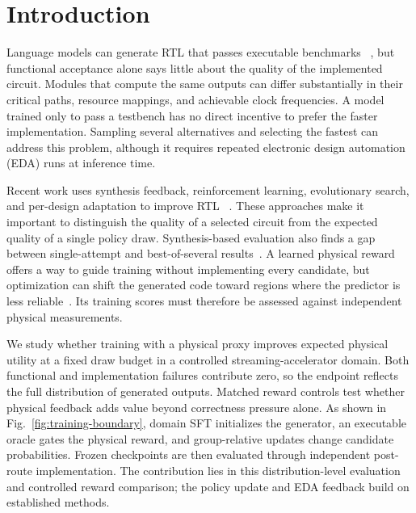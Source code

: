 \section{Introduction}
\label{sec:introduction}

Language models can generate RTL that passes executable benchmarks
~\cite{liu2023verilogeval,lu2024rtllm,pinckney2025revisiting}, but functional
acceptance alone says little about the quality of the implemented circuit.
Modules that compute the same outputs can differ substantially in their critical
paths, resource mappings, and achievable clock frequencies. A model trained
only to pass a testbench has no direct incentive to prefer the faster
implementation. Sampling several alternatives and selecting the fastest can
address this problem, although it requires repeated electronic design automation
(EDA) runs at inference time.

Recent work uses synthesis feedback, reinforcement learning, evolutionary
search, and per-design adaptation to improve RTL
~\cite{ppartl2025,chipseek2025,yao2024rtlrewriter,poet2026,
evolve2026,zhou2026alphartl,drrtl2026}. These approaches make it important to
distinguish the quality of a selected circuit from the expected quality of a
single policy draw. Synthesis-based evaluation also finds a gap between
single-attempt and best-of-several results~\cite{fu2026synthesis}. A learned
physical reward offers a way to guide training without implementing every
candidate, but optimization can shift the generated code toward regions where
the predictor is less reliable~\cite{gao2023scaling}. Its training scores must
therefore be assessed against independent physical measurements.

We study whether training with a physical proxy improves expected physical
utility at a fixed draw budget in a controlled streaming-accelerator domain.
Both functional and implementation failures contribute zero, so the endpoint
reflects the full distribution of generated outputs. Matched reward controls
test whether physical feedback adds value beyond correctness pressure alone.
As shown in Fig.~\ref{fig:training-boundary}, domain SFT initializes the
generator, an executable oracle gates the physical reward, and group-relative
updates change candidate probabilities. Frozen checkpoints are then evaluated
through independent post-route implementation. The contribution lies in this
distribution-level evaluation and controlled reward comparison; the policy
update and EDA feedback build on established methods.

